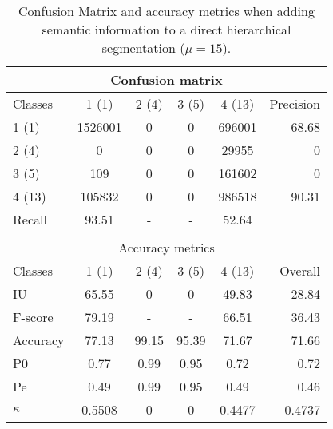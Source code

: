 \begin{table}[H]
\begin{center}
\footnotesize
\begin{tabular}{|l|c|c|c|c|r|}
\hline
\multicolumn{6}{|c|}{Confusion matrix} \\
\hline
 Classes & 1 (1) & 2 (4) & 3 (5) & 4 (13) & Precision \\
\hline
1 (1) & 1526001 & 0 & 0 & 696001 & 68.68 \\
\hline
2 (4) & 0 & 0 & 0 & 29955 & 0 \\
\hline
3 (5) & 109 & 0 & 0 & 161602 & 0 \\
\hline
4 (13) & 105832 & 0 & 0 & 986518 & 90.31 \\
\hline
Recall & 93.51 & - & - & 52.64 &  \\
\hline
\multicolumn{6}{c}{ } \\
\hline
\multicolumn{6}{|c|}{Accuracy metrics} \\
\hline
 Classes & 1 (1) & 2 (4) & 3 (5) & 4 (13) & Overall \\
\hline
IU & 65.55 & 0 & 0 & 49.83 & 28.84 \\
\hline
F-score & 79.19 & - & - & 66.51 & 36.43 \\
\hline
Accuracy & 77.13 & 99.15 & 95.39 & 71.67 & 71.66 \\
\hline
P0 & 0.77 & 0.99 & 0.95 & 0.72 & 0.72 \\
\hline
Pe & 0.49 & 0.99 & 0.95 & 0.49 & 0.46 \\
\hline
$\kappa$ & 0.5508 & 0 & 0 & 0.4477 & 0.4737 \\
\hline
\end{tabular}
\caption{Confusion Matrix and accuracy metrics when adding semantic information to a direct hierarchical segmentation ($\mu=15$).}
\label{table:C3_S2_seg_hierar_z}
\end{center}
\end{table}